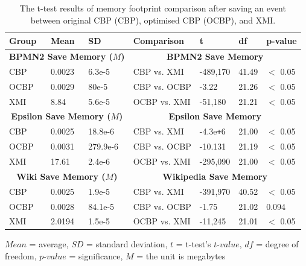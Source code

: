\documentclass{llncs}
\begin{document}
   \begin{table}[t]
       \footnotesize
       \centering
       \caption{The t-test results of memory footprint comparison after saving an event between original CBP (CBP), optimised CBP (OCBP), and XMI.}
       \label{table:ttest_results_save_memory}
       \begin{tabular}
           {|p{}p{}p{}|p{}p{}p{}p{}|}
           \hline 
           
           Group & Mean & SD & Comparison & t  & df & p-value \\
           \hline 
           \multicolumn{3}{|c|}{\textbf{BPMN2 Save Memory ($M$)}} & \multicolumn{4}{c|}{\textbf{BPMN2 Save Memory}} \\
           CBP &0.0023    & 6.3e-5 & CBP vs. XMI &  -489,170    & 41.49 & $<$ 0.05 \\  
           OCBP &0.0029    & 80e-5 & CBP vs. OCBP & -3.22 & 21.26 & $<$ 0.05 \\
           XMI & 8.84   & 5.6e-5 & OCBP vs. XMI & -51,180    &  21.21  & $<$ 0.05 \\ 
           \hline 
           
           \multicolumn{3}{|c|}{\textbf{Epsilon Save Memory ($M$)}} & \multicolumn{4}{c|}{\textbf{Epsilon Save Memory}}\\
           CBP & 0.0025    & 18.8e-6 &  CBP vs. XMI & -4.3e\texttt{+}6   & 21.00 & $<$ 0.05 \\
           OCBP & 0.0031    & 279.9e-6 & CBP vs. OCBP & -10.131 & 21.19 & $<$ 0.05 \\ %
           XMI & 17.61   & 2.4e-6 & OCBP vs. XMI & -295,090  &21.00  & $<$ 0.05 \\ 
           \hline 
           
           \multicolumn{3}{|c|}{\textbf{Wiki Save Memory ($M$)}} & \multicolumn{4}{c|}{\textbf{Wikipedia Save Memory}} \\
           CBP & 0.0025  &1.9e-5 & CBP vs. XMI &  -391,970   & 40.52 & $<$ 0.05 \\ 
           OCBP &  0.0028   & 84.1e-5 & CBP vs. OCBP &  -1.75 & 21.02 &  0.094 \\ 
           XMI &  2.0194   & 1.5e-5 & OCBP vs. XMI &  -11,245  & 21.01 & $<$ 0.05 \\ 
           \hline
       \end{tabular}
       \justify
       $Mean$ = average, $SD$ = standard deviation, $t$ = t-test's $t$-$value$, $df$ = degree of freedom, $p$-$value$ = significance, $M$ = the unit is megabytes
   \end{table}
\end{document}
